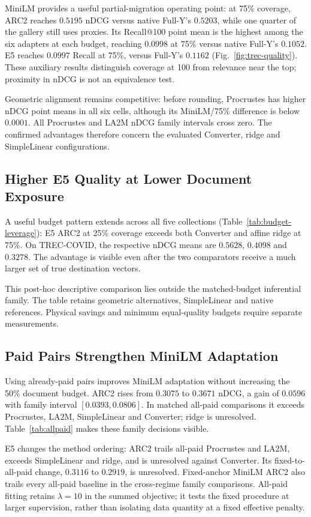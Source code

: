 MiniLM provides a useful partial-migration operating point: at 75\% coverage,
ARC2 reaches $0.5195$ nDCG versus native Full-Y's $0.5203$, while one quarter
of the gallery still uses proxies. Its Recall@100 point mean is the highest
among the six adapters at each budget, reaching $0.0998$ at 75\% versus
native Full-Y's $0.1052$. E5 reaches $0.0997$ Recall at 75\%, versus Full-Y's
$0.1162$ (Fig.~\ref{fig:trec-quality}). These auxiliary results distinguish
coverage at 100 from relevance near the top; proximity in nDCG is not an
equivalence test.

Geometric alignment remains competitive: before rounding, Procrustes has
higher nDCG point means in all six cells, although its MiniLM/75\% difference
is below $0.0001$. All Procrustes and LA2M nDCG family intervals cross zero.
The confirmed advantages therefore concern the evaluated Converter, ridge
and SimpleLinear configurations.

\subsection{Higher E5 Quality at Lower Document Exposure}

A useful budget pattern extends across all five collections
(Table~\ref{tab:budget-leverage}): E5 ARC2 at 25\% coverage exceeds both
Converter and affine ridge at 75\%. On TREC-COVID, the respective nDCG means
are $0.5628$, $0.4098$ and $0.3278$. The advantage is visible even after the
two comparators receive a much larger set of true destination vectors.

This post-hoc descriptive comparison lies outside the matched-budget
inferential family. The table retains geometric alternatives, SimpleLinear
and native references. Physical savings and minimum equal-quality budgets
require separate measurements.

\subsection{Paid Pairs Strengthen MiniLM Adaptation}

Using already-paid pairs improves MiniLM adaptation without increasing the
50\% document budget. ARC2 rises from $0.3075$ to $0.3671$ nDCG, a gain of
$0.0596$ with family interval $[0.0393,0.0806]$. In matched all-paid
comparisons it exceeds Procrustes, LA2M, SimpleLinear and Converter; ridge is
unresolved. Table~\ref{tab:allpaid} makes these family decisions visible.

E5 changes the method ordering: ARC2 trails all-paid Procrustes and LA2M,
exceeds SimpleLinear and ridge, and is unresolved against Converter. Its
fixed-to-all-paid change, $0.3116$ to $0.2919$, is unresolved. Fixed-anchor
MiniLM ARC2 also trails every all-paid baseline in the cross-regime family
comparisons. All-paid fitting retains $\lambda=10$ in the summed objective;
it tests the fixed procedure at larger supervision, rather than isolating
data quantity at a fixed effective penalty.

